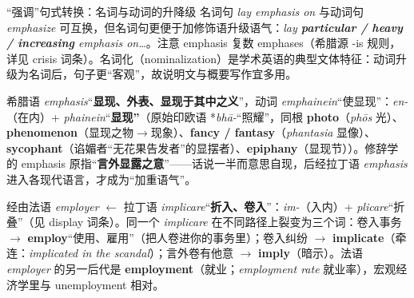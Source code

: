 \documentclass[../main.tex]{subfiles}
\begin{document}


\begin{gram}{“强调”句式转换：名词与动词的升降级}
名词句 \textit{lay emphasis on} 与动词句 \textit{emphasize} 可互换，但名词句更便于加修饰语升级语气：\textit{lay \textbf{particular / heavy / increasing} emphasis on\dots}。注意 emphasis 复数 emphases（希腊源 -is 规则，详见 crisis 词条）。名词化（nominalization）是学术英语的典型文体特征：动词升级为名词后，句子更“客观”，故说明文与概要写作宜多用。
\end{gram}

\begin{origin}
希腊语 \textit{emphasis}“\textbf{显现、外表、显现于其中之义}”，动词 \textit{emphainein}“使显现”：\textit{en-}（在内）+ \textit{phainein}“\textbf{显现”}（原始印欧语 *\textit{bhā-}“照耀”，同根 \textbf{photo}（\textit{phōs} 光）、\textbf{phenomenon}（显现之物$\to$现象）、\textbf{fancy / fantasy}（\textit{phantasia} 显像）、\textbf{sycophant}（谄媚者“无花果告发者”的显摆者）、\textbf{epiphany}（显现节））。修辞学的 emphasis 原指“\textbf{言外显露之意}”——话说一半而意思自现，后经拉丁语 \textit{emphasis} 进入各现代语言，才成为“加重语气”。
\end{origin}




\begin{origin}
经由法语 \textit{employer} $\leftarrow$ 拉丁语 \textit{implicare}“\textbf{折入、卷入}”：\textit{im-}（入内）+ \textit{plicare}“折叠”（见 display 词条）。同一个 \textit{implicare} 在不同路径上裂变为三个词：卷入事务 $\to$ \textbf{employ}“使用、雇用”（把人卷进你的事务里）；卷入纠纷 $\to$ \textbf{implicate}（牵连：\textit{implicated in the scandal}）；言外卷有他意 $\to$ \textbf{imply}（暗示）。法语 \textit{employer} 的另一后代是 \textbf{employment}（就业；\textit{employment rate} 就业率），宏观经济学里与 unemployment 相对。
\end{origin}
\end{document}
